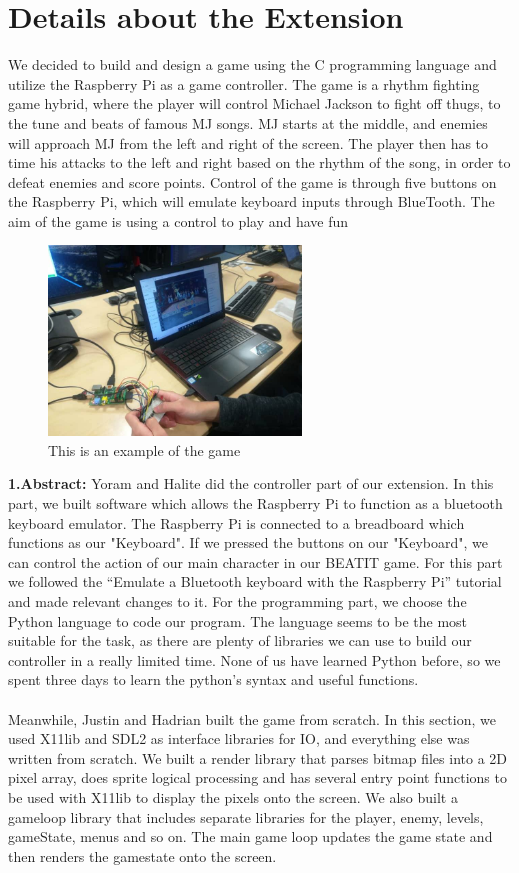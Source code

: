 \documentclass[a4paper]{article}
\begin{document}
\section{Details about the Extension}
We decided to build and design a game using the C programming language and utilize the Raspberry Pi as a game controller. The game is a rhythm fighting game hybrid, where the player will control Michael Jackson to fight off thugs, to the tune and beats of famous MJ songs. MJ starts at the middle, and enemies will approach MJ from the left and right of the screen. The player then has to time his attacks to the left and right based on the rhythm of the song, in order to defeat enemies and score points. Control of the game is through five buttons on the Raspberry Pi, which will emulate keyboard inputs through BlueTooth. The aim of the game is using a control to play and have fun
\begin{figure}[h]
\centering
\includegraphics[width=0.6\textwidth]{game.jpg}
\caption{\label{fig:pi}This is an example of the game}
\end{figure}


\textbf{1.Abstract:}  Yoram and Halite did the controller part of our extension. In this part, we built software which allows the Raspberry Pi to function as a bluetooth keyboard emulator. The Raspberry Pi is connected to a breadboard which functions as our "Keyboard". If we pressed the buttons on our "Keyboard", we can control the action of our main character in our BEATIT game. For this part we followed the “Emulate a Bluetooth keyboard with the Raspberry Pi” tutorial and made relevant changes to it.
For the programming part, we choose the Python language to code our program. The language seems to be the most suitable for the task, as there are plenty of libraries we can use to build our controller in a really limited time. None of us have learned Python before, so we spent three days to learn the python’s syntax and useful functions.\\\\
Meanwhile, Justin and Hadrian built the game from scratch. In this section, we used X11lib and SDL2 as interface libraries for IO, and everything else was written from scratch. We built a render library that parses bitmap files into a 2D pixel array, does sprite logical processing and has several entry point functions to be used with X11lib to display the pixels onto the screen. We also built a gameloop library that includes separate libraries for the player, enemy, levels, gameState, menus and so on. The main game loop updates the game state and then renders the gamestate onto the screen.
\end{document}
